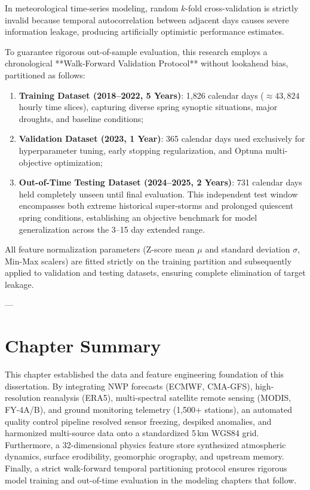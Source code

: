 In meteorological time-series modeling, random $k$-fold cross-validation is strictly invalid because temporal autocorrelation between adjacent days causes severe information leakage, producing artificially optimistic performance estimates.

To guarantee rigorous out-of-sample evaluation, this research employs a chronological **Walk-Forward Validation Protocol** without lookahead bias, partitioned as follows:
\begin{enumerate}
    \item \textbf{Training Dataset (2018--2022, 5 Years)}: 1{,}826 calendar days ($\approx 43{,}824$ hourly time slices), capturing diverse spring synoptic situations, major droughts, and baseline conditions;
    \item \textbf{Validation Dataset (2023, 1 Year)}: 365 calendar days used exclusively for hyperparameter tuning, early stopping regularization, and Optuna multi-objective optimization;
    \item \textbf{Out-of-Time Testing Dataset (2024--2025, 2 Years)}: 731 calendar days held completely unseen until final evaluation. This independent test window encompasses both extreme historical super-storms and prolonged quiescent spring conditions, establishing an objective benchmark for model generalization across the 3--15 day extended range.
\end{enumerate}

All feature normalization parameters (Z-score mean $\mu$ and standard deviation $\sigma$, Min-Max scalers) are fitted strictly on the training partition and subsequently applied to validation and testing datasets, ensuring complete elimination of target leakage.

---

\section{Chapter Summary}
\label{sec:ch3_summary}

This chapter established the data and feature engineering foundation of this dissertation. By integrating NWP forecasts (ECMWF, CMA-GFS), high-resolution reanalysis (ERA5), multi-spectral satellite remote sensing (MODIS, FY-4A/B), and ground monitoring telemetry (1{,}500+ stations), an automated quality control pipeline resolved sensor freezing, despiked anomalies, and harmonized multi-source data onto a standardized 5\,km WGS84 grid. Furthermore, a 32-dimensional physics feature store synthesized atmospheric dynamics, surface erodibility, geomorphic orography, and upstream memory. Finally, a strict walk-forward temporal partitioning protocol ensures rigorous model training and out-of-time evaluation in the modeling chapters that follow.
